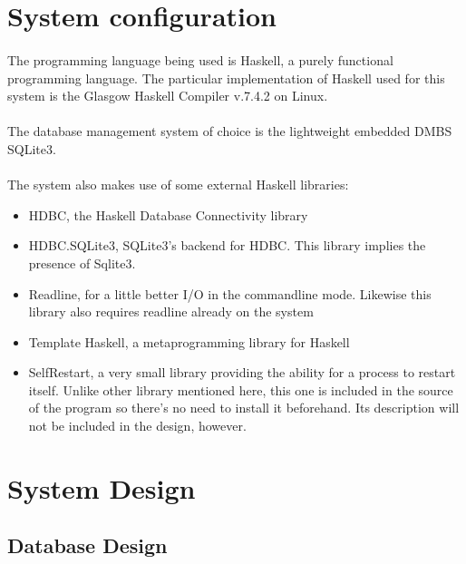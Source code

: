 \documentclass[../gr-final.tex]{subfiles}
\begin{document}
\section{System configuration}

\paragraph{}The programming language being used is Haskell, a purely functional programming language. The particular implementation of Haskell used for this system is the Glasgow  Haskell Compiler v.7.4.2 on Linux.

\paragraph{}The database management system of choice is the lightweight embedded DMBS SQLite3. 

\paragraph{}The system also makes use of some external Haskell libraries: 

\begin{itemize}
\item HDBC, the Haskell Database Connectivity library
\item HDBC.SQLite3, SQLite3's backend for HDBC. This library implies
  the presence of Sqlite3.
\item Readline, for a little better I/O in the
  commandline mode. Likewise this library also requires readline
  already on the system
\item Template Haskell, a metaprogramming library for Haskell
\item SelfRestart, a very small library providing the ability for a
  process to restart itself. Unlike other library mentioned here, this
  one is included in the source of the program so there's no need to
  install it beforehand. Its description will not be included in
  the design, however.  
\end{itemize}



\section{System Design}
\subsection{Database Design}
\end{document}
